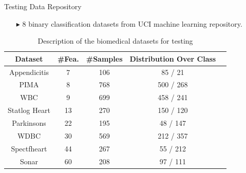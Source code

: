 \documentclass[aspectratio=1610]{beamer}
\begin{document}
\begin{frame}
\begin{columns}[T]
	\begin{column}{0.5\textwidth}
		\begin{block}{Testing Data Repository}
			\begin{itemize}
				\item[$\blacktriangleright$] 8 binary classification datasets from UCI machine learning repository.
			\end{itemize}
		\end{block}
		
		\begin{table}\tiny
			\caption{\scriptsize{Description of the biomedical datasets for testing}}
			\centering
			\begin{tabular}{c c c c c}
				\toprule
				\textbf{Dataset} & \textbf{\#Fea.} & \textbf{\#Samples} & \textbf{Distribution Over Class}  \\
				\midrule
				\centering
				Appendicitis  &  7 &  106  &  85 / 21     \\
				PIMA 		  &  8 &  768  &  500 / 268   \\
				WBC			  &  9 &  699  &  458 / 241   \\
				Statlog Heart & 13 &  270  &  150 / 120   \\
				Parkinsons	  & 22 &  195  &  48 / 147    \\
				WDBC          & 30 &  569  &  212 / 357   \\
				Spectfheart   & 44 &  267  &  55 / 212    \\
				Sonar         & 60 &  208  &  97 / 111    \\
				\bottomrule
			\end{tabular}
		\end{table}
	\end{column}
\end{columns}
\end{frame}
\end{document}
